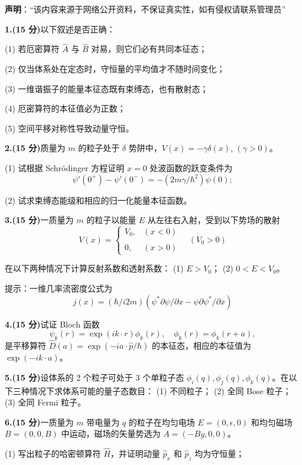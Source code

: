 
\textbf{声明}：“该内容来源于网络公开资料，不保证真实性，如有侵权请联系管理员”

\textbf{1.(15 分)}以下叙述是否正确：

(1) 若厄密算符 $\hat{A}$ 与 $\hat{B}$ 对易，则它们必有共同本征态；

(2) 仅当体系处在定态时，守恒量的平均值才不随时间变化；

(3) 一维谐振子的能量本征态既有束缚态，也有散射态；

(4) 厄密算符的本征值必为正数；

(5) 空间平移对称性导致动量守恒。

\textbf{2.(15 分)}质量为 $m$ 的粒子处于 $\delta$ 势阱中，$V(x) = -\gamma \delta(x)$, $(\gamma > 0)$。

(1) 试根据 Schrödinger 方程证明 $x=0$ 处波函数的跃变条件为
$$\psi'(0^+) - \psi'(0^-) = -\left(2m\gamma/\hbar^2\right)\psi(0);~$$

(2) 试求束缚态能级和相应的归一化能量本征函数。

\textbf{3.(15 分)}一质量为 $m$ 的粒子以能量 $E$ 从左往右入射，受到以下势场的散射
$$V(x) =\begin{cases} V_0, & (x < 0) \\\\0, & (x > 0) \end{cases}\quad (V_0 > 0)~$$

在以下两种情况下计算反射系数和透射系数：
(1) $E > V_0$；
(2) $0 < E < V_0$。

提示：一维几率流密度公式为 
$$j(x) = \left(\hbar/i2m\right)\left(\psi^* \partial \psi/\partial x - \psi \partial \psi^*/\partial x\right)~$$

\textbf{4.(15 分)}试证 Bloch 函数
$$\psi_k(r) = \exp(ik \cdot r)\phi_k(r), \quad \phi_k(r) = \phi_k(r + a),~$$
是平移算符 $\hat{D}(a) = \exp\left(-ia \cdot \hat{p}/\hbar\right)$ 的本征态，相应的本征值为 $\exp\left(-ik \cdot a\right)$。

\textbf{5.(15 分)}设体系的 2 个粒子可处于 3 个单粒子态 $\phi_i(q), \phi_j(q), \phi_k(q)$。在以下三种情况下求体系可能的量子态数目：
(1) 不同粒子；
(2) 全同 Bose 粒子；
(3) 全同 Fermi 粒子。

\textbf{6.(15 分)}一质量为 $m$ 带电量为 $q$ 的粒子在均匀电场 $E = (0, \epsilon, 0)$ 和均匀磁场 $B = (0, 0, B)$ 中运动，磁场的矢量势选为 $A = (-By, 0, 0)$。

(1) 写出粒子的哈密顿算符 $\hat{H}$，并证明动量 $\hat{p}_x$ 和 $\hat{p}_z$ 均为守恒量；

